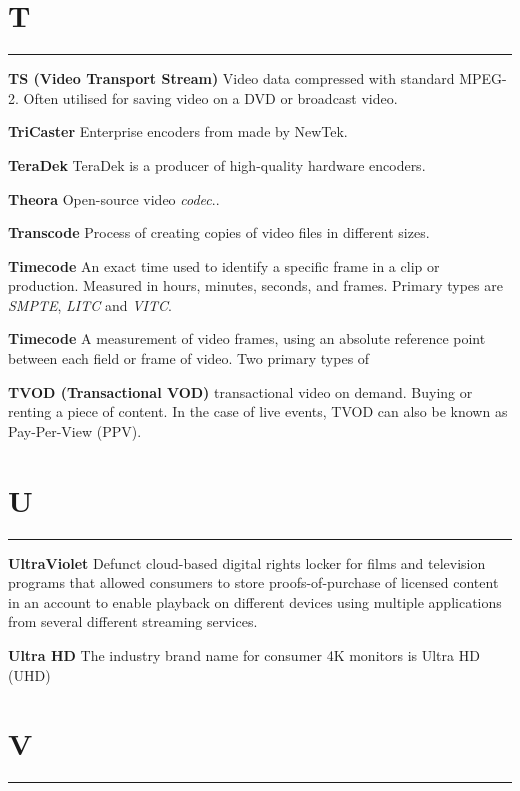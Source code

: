 \section{T}
\hrule

\medskip
\textbf{TS (Video Transport Stream)}
Video data compressed with standard MPEG-2. Often utilised for saving video on a DVD or broadcast video.


\smallskip
\textbf{TriCaster}
Enterprise encoders from made by NewTek.

\smallskip
\textbf{TeraDek}
TeraDek is a producer of high-quality hardware encoders.


\smallskip
\textbf{Theora}
Open-source video \textit{codec}..

\smallskip
\textbf{Transcode}
Process of creating copies of video files in different sizes.

\smallskip
\textbf{Timecode}
An exact time used to identify a specific frame in a clip or production. Measured in hours, minutes, seconds, and frames. Primary types are \textit{SMPTE}, \textit{LITC} and \textit{VITC}.

\smallskip
\textbf{Timecode}
A measurement of video frames, using an absolute reference point between each field or frame of video. Two primary types of

\smallskip
\textbf{TVOD (Transactional VOD)}
transactional video on demand. Buying or renting a piece of content. In the case of live events, TVOD can also be known as Pay-Per-View (PPV).


\section{U}
\hrule

\medskip
\textbf{UltraViolet}
Defunct cloud-based digital rights locker for films and television programs that allowed consumers to store proofs-of-purchase of licensed content in an account to enable playback on different devices using multiple applications from several different streaming services.

\smallskip
\textbf{Ultra HD}
The industry brand name for consumer 4K monitors is Ultra HD (UHD)

\section{V}
\hrule

